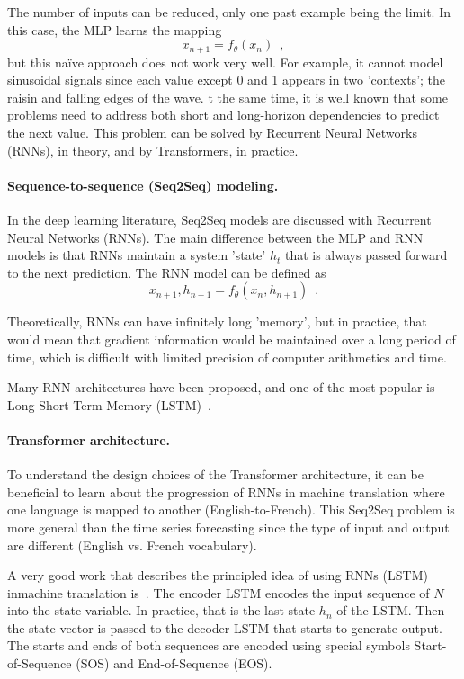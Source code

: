 \documentclass[final]{article}
\begin{document}
The number of inputs can be reduced, only one past example being the
limit. In this case, the MLP learns the mapping
\[
x_{n+1} = f_\theta (x_{n}) \enspace ,
\]
but this naïve approach does not work very well. For example, it
cannot model sinusoidal signals since each value except 0 and 1
appears in two ’contexts'; the raisin and falling edges of the wave.
t the same time, it is well known that some problems need to address
both short and long-horizon dependencies to predict the next value.
This problem can be solved by Recurrent Neural Networks (RNNs), in
theory, and by Transformers, in practice.


\paragraph{Sequence-to-sequence (Seq2Seq) modeling.}
In the deep learning literature, Seq2Seq models are discussed with
Recurrent Neural Networks (RNNs). The main difference between the MLP
and RNN models is that RNNs maintain a system 'state' $h_t$ that is
always passed forward to the next prediction. The RNN model can be
defined as
\[
x_{n+1},h_{n+1} = f_\theta (x_{n},h_{n+1}) \enspace .
\]

Theoretically, RNNs can have infinitely long 'memory', but in practice,
that would mean that gradient information would be maintained over a
long period of time, which is difficult with limited precision of
computer arithmetics and time. 

Many RNN architectures have been proposed, and one of the most popular
is Long Short-Term Memory (LSTM)~\cite{LSTM}.


\paragraph{Transformer architecture.}
To understand the design choices of the Transformer architecture, it
can be beneficial to learn about the progression of RNNs in machine
translation where one language is mapped to another
(English-to-French). This Seq2Seq problem is more general than the
time series forecasting since the type of input and output are
different (English vs. French vocabulary).


A very good work that describes the principled idea of using RNNs
(LSTM) inmachine translation is~\cite{Sutskever-2014-neurips}.
The encoder LSTM encodes the input sequence of $N$ into the state
variable. In practice, that is the last state $h_n$ of the LSTM. Then
the state vector is passed to the decoder LSTM that starts to generate
output. The starts and ends of both sequences are encoded using
special symbols Start-of-Sequence (SOS) and End-of-Sequence (EOS).
\end{document}
